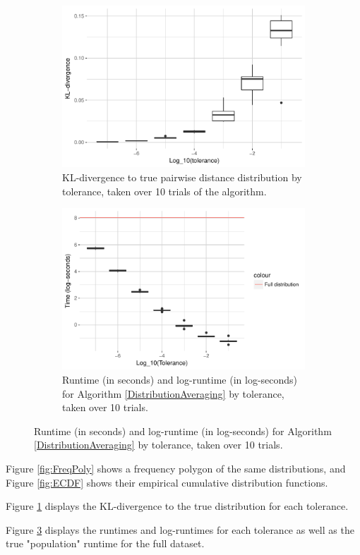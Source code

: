 \documentclass{article}
\begin{document}
\begin{figure}
\begin{subfigure}{.5\textwidth}
        \includegraphics[width=\linewidth]{Figures/PairwiseDistance/div_by_tol.pdf}
    	\caption{KL-divergence to true pairwise distance distribution by tolerance, taken over 10 trials of the algorithm.}
    	\label{fig:Divergences}
	\end{subfigure}
    \begin{subfigure}{.5\textwidth}
    	\includegraphics[width=0.9\linewidth]{Figures/PairwiseDistance/log_time_by_tol.pdf}
    	\caption{Runtime (in seconds) and log-runtime (in log-seconds) for Algorithm \ref{DistributionAveraging} by tolerance, taken over 10 trials.}
    	\label{fig:Times}
    \end{subfigure}
\end{figure}
Figure \ref{fig:FreqPoly} shows a frequency polygon of the same distributions, and Figure \ref{fig:ECDF} shows their empirical cumulative distribution functions.

Figure \ref{fig:Divergences} displays the KL-divergence to the true distribution for each tolerance.
\begin{figure}

\end{figure}
Figure \ref{fig:Times} displays the runtimes and log-runtimes for each tolerance as well as the true "population" runtime for the full dataset.
\end{document}

